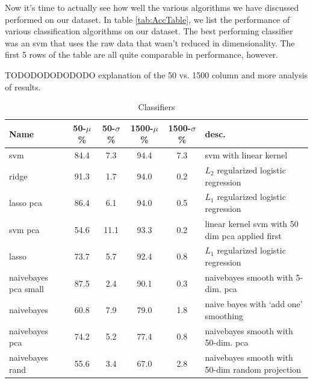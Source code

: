 
%

Now it's time to actually see how well the various algorithms we have discussed performed on our dataset. In table \ref{tab:AccTable}, we list the performance of various classification algorithms on our dataset. The best performing classifier was an svm that uses the raw data that wasn't reduced in dimensionality. The first 5 rows of the table are all quite comparable in performance, however. 

TODODODODODODO explanation of the 50 vs. 1500 column and more analysis of results. 

\begin{center}
\begin{table}
\begin{tabular}{lccccl}
\hline
Name & 50-$\mu$ \% & 50-$\sigma$ \% & 1500-$\mu$ \% & 1500-$\sigma$ \% &  desc.\\
\hline
svm & 84.4 & 7.3 & 94.4 & 7.3 & svm with linear kernel\\
ridge & 91.3 & 1.7 & 94.0 & 0.2 & $L_2$ regularized logistic regression\\
lasso pca &  86.4 & 6.1& 94.0 & 0.5 & $L_1$ regularized logistic regression\\
svm pca &54.6 & 11.1&  93.3 & 0.2 &  linear kernel svm with 50 dim pca applied first\\
lasso & 73.7& 5.7 & 92.4 & 0.8 & $L_1$ regularized logistic regression\\
naivebayes pca small & 87.5& 2.4 & 90.1 & 0.3  & naivebayes smooth with 5-dim. pca\\
naivebayes & 60.8 & 7.9& 79.0 & 1.8& naive bayes with `add one' smoothing\\
naivebayes pca  & 74.2 & 5.2 & 77.4 & 0.8 & naivebayes smooth with 50-dim. pca\\
naivebayes rand & 55.6 & 3.4 & 67.0 & 2.8  & naivebayes smooth with 50-dim random projection\\
\end{tabular}
\caption{Classifiers}
\label{tab:Classifiers}
\par
\end{table}
\end{center}




